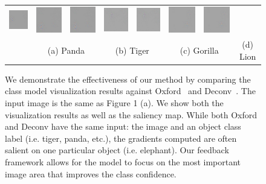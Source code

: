 \begin{figure}
\begin{center}
\begin{tabular}{ccccccccc}
\includegraphics[width=0.11\linewidth]{figs/visual_compare/saliency/feedback/panda} &
\includegraphics[width=0.11\linewidth]{figs/visual_compare/gradient/feedback/tiger} &
\includegraphics[width=0.11\linewidth]{figs/visual_compare/saliency/feedback/tiger} &
\includegraphics[width=0.11\linewidth]{figs/visual_compare/gradient/feedback/gorilla} &
\includegraphics[width=0.11\linewidth]{figs/visual_compare/saliency/feedback/gorilla} &
\includegraphics[width=0.11\linewidth]{figs/visual_compare/gradient/feedback/lion} &
\includegraphics[width=0.11\linewidth]{figs/visual_compare/saliency/feedback/lion} \\
&
\multicolumn{2}{c}{{\small (a) Panda}} &
\multicolumn{2}{c}{{\small (b) Tiger}} &
\multicolumn{2}{c}{{\small (c) Gorilla}} &
\multicolumn{2}{c}{{\small (d) Lion}} \\
\end{tabular}
\caption{We demonstrate the effectiveness of our method by comparing the class model visualization results against Oxford~\cite{simonyan2013deep} and Deconv~\cite{zeiler2014visualizing}. The input image is the same as Figure 1 (a). We show both the visualization results as well as the saliency map. While both Oxford and Deconv have the same input: the image and an object class label (i.e. tiger, panda, etc.), the gradients computed are often salient on one particular object (i.e. elephant). Our feedback framework allows for the model to focus on the most important image area that improves the class confidence.}
\label{fig:visual_compare}
\end{center}
\end{figure}

